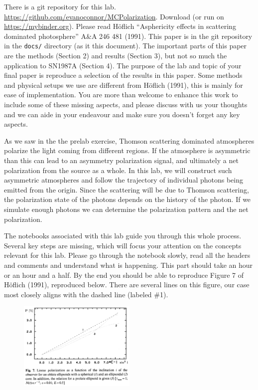 \documentclass[12pt]{amsart}
\begin{document}
There is a git repository for this lab.
\url{https://github.com/evanoconnor/MCPolarization}. Download (or run
on \url{https://mybinder.org}).  Please read H\"oflich ``Asphericity
effects in scattering dominated photosphere'' A\&A 246 481
(1991). This paper is in the git repository in the {\tt {docs/}}
directory (as it this document).  The important parts of this paper
are the methods (Section 2) and results (Section 3), but not so much
the application to SN1987A (Section 4).  The purpose of the lab and
topic of your final paper is reproduce a selection of the results in
this paper.  Some methods and physical setups we use are different
from H\"oflich (1991), this is mainly for ease of implementation.  You
are more than welcome to enhance this work to include some of these
missing aspects, and please discuss with us your thoughts and we can
aide in your endeavour and make sure you doesn't forget any key
aspects. \newline

As we saw in the the prelab exercise, Thomson scattering
dominated atmospheres polarize the light coming from different
regions.  If the atmosphere is asymmetric than this can lead to an
asymmetry polarization signal, and ultimately a net polarization from
the source as a whole.  In this lab, we will construct such asymmetric
atmospheres and follow the trajectory of individual photons being
emitted from the origin.  Since the scattering will be due to Thomson
scattering, the polarization state of the photons depends on the
history of the photon.  If we simulate enough photons we can determine
the polarization pattern and the net polarization. \newline

The notebooks associated with this lab guide you through this whole
process.  Several key steps are missing, which will focus your
attention on the concepts relevant for this lab.  Please go through
the notebook slowly, read all the headers and comments and understand
what is happening. This part should take an hour or an hour and a
half.  By the end you should be able to reproduce Figure 7 of
H\"oflich (1991), reproduced below.  There are several lines on this
figure, our case most closely aligns with the dashed line (labeled \#1). \newline

\begin{figure}[h]
  \includegraphics[width=0.5\textwidth]{hoeflich1991_fig7.png}
\end{figure}
\end{document}
